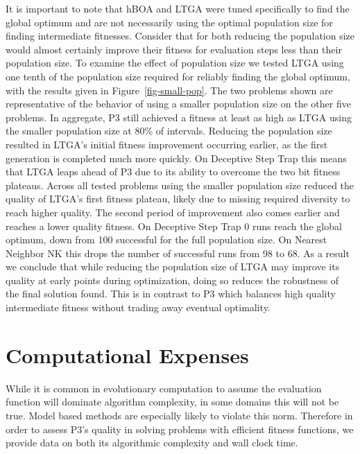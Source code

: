 \documentclass[twoside]{article}
\begin{document}
It is important to note that hBOA and LTGA were tuned specifically
to find the global optimum and are not necessarily using the optimal population size for finding intermediate fitnesses. Consider
that for both reducing the population size would almost certainly improve their fitness for evaluation steps less than their population
size. To examine the effect of population size we tested LTGA using one tenth of the population size required for reliably finding the
global optimum, with the results given in Figure~\ref{fig-small-pop}. The two problems shown are representative of the behavior of using
a smaller population size on the other five problems. In aggregate, P3 still achieved a fitness at
least as high as LTGA using the smaller population size at 80\% of intervals.
Reducing the population size resulted in LTGA's initial fitness improvement
occurring earlier, as the first generation is completed much more quickly. On Deceptive Step Trap this means that
LTGA leaps ahead of P3 due to its ability to overcome the two bit fitness plateaus.
%
Across all tested problems using the smaller
population size reduced the quality of LTGA's first fitness plateau, likely due to missing required diversity to reach higher quality.
The second period of improvement also comes earlier and reaches a lower quality fitness. On Deceptive Step Trap 0
runs reach the global optimum, down from 100 successful for the full population size. On Nearest Neighbor NK this drops the number
of successful runs from 98 to 68. As a result we conclude that while reducing the population size of LTGA may improve its quality
at early points during optimization, doing so reduces the robustness of the final solution found. This is in contrast to P3
which balances high quality intermediate fitness without trading away eventual optimality.

\section{Computational Expenses}
While it is common in evolutionary computation to assume the evaluation function will dominate algorithm
complexity, in some domains this will not be true. Model based methods are especially likely to violate
this norm. Therefore in order to assess P3's quality in solving problems with efficient fitness functions,
we provide data on both its algorithmic complexity and wall clock time.
\end{document}
